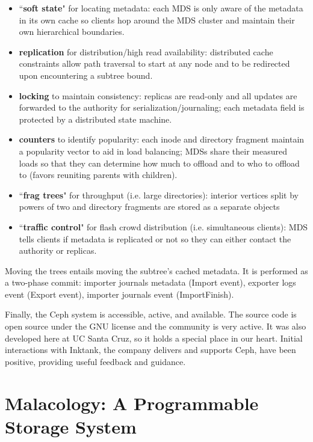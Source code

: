\begin{itemize}

\item ``\textbf{soft state}" for locating metadata: each MDS is only aware of
the metadata in its own cache so clients hop around the MDS cluster and
maintain their own hierarchical boundaries.

\item \textbf{replication} for distribution/high read availability: distributed
cache constraints allow path traversal to start at any node and to be
redirected upon encountering a subtree bound.

\item \textbf{locking} to maintain consistency: replicas are read-only and all
updates are forwarded to the authority for serialization/journaling; each
metadata field is protected by a distributed state machine.

\item \textbf{counters} to identify popularity: each inode and directory
fragment maintain a popularity vector to aid in load balancing; MDSs share
their measured loads so that they can determine how much to offload and to who
to offload to (favors reuniting parents with children). 

\item ``\textbf{frag trees}" for throughput (i.e. large directories): interior
vertices split by powers of two and directory fragments are stored as a
separate objects

\item ``\textbf{traffic control}" for flash crowd distribution (i.e.
simultaneous clients): MDS tells clients if metadata is replicated or not so
they can either contact the authority or replicas.

\end{itemize}

Moving the trees entails moving the subtree's cached metadata. It is performed
as a two-phase commit: importer journals metadata (Import event), exporter logs
event (Export event), importer journals event (ImportFinish). 

Finally, the Ceph system is accessible, active, and available. The source code
is open source under the GNU license and the community is very active. It was
also developed here at UC Santa Cruz, so it holds a special place in our heart.
Initial interactions with Inktank, the company delivers and supports Ceph, have
been positive, providing useful feedback and guidance. 



\section{Malacology: A Programmable Storage System}

